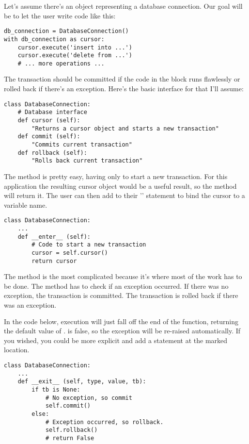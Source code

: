 \documentclass{howto}
\begin{document}
Let's assume there's an object representing a database connection.
Our goal will be to let the user write code like this:

\begin{verbatim}
db_connection = DatabaseConnection()
with db_connection as cursor:
    cursor.execute('insert into ...')
    cursor.execute('delete from ...')
    # ... more operations ...
\end{verbatim}

The transaction should be committed if the code in the block
runs flawlessly or rolled back if there's an exception.
Here's the basic interface
for  that I'll assume:

\begin{verbatim}
class DatabaseConnection:
    # Database interface
    def cursor (self):
        "Returns a cursor object and starts a new transaction"
    def commit (self):
        "Commits current transaction"
    def rollback (self):
        "Rolls back current transaction"
\end{verbatim}

The  method is pretty easy, having only to start
a new transaction.  For this application the resulting cursor object
would be a useful result, so the method will return it.  The user can
then add  to their '' statement to bind
the cursor to a variable name.

\begin{verbatim}
class DatabaseConnection:
    ...
    def __enter__ (self):
        # Code to start a new transaction
        cursor = self.cursor()
        return cursor
\end{verbatim}

The  method is the most complicated because it's
where most of the work has to be done.  The method has to check if an
exception occurred.  If there was no exception, the transaction is
committed.  The transaction is rolled back if there was an exception.

In the code below, execution will just fall off the end of the
function, returning the default value of .   is
false, so the exception will be re-raised automatically.  If you
wished, you could be more explicit and add a 
statement at the marked location.

\begin{verbatim}
class DatabaseConnection:
    ...
    def __exit__ (self, type, value, tb):
        if tb is None:
            # No exception, so commit
            self.commit()
        else:
            # Exception occurred, so rollback.
            self.rollback()
            # return False
\end{verbatim}
\end{document}
